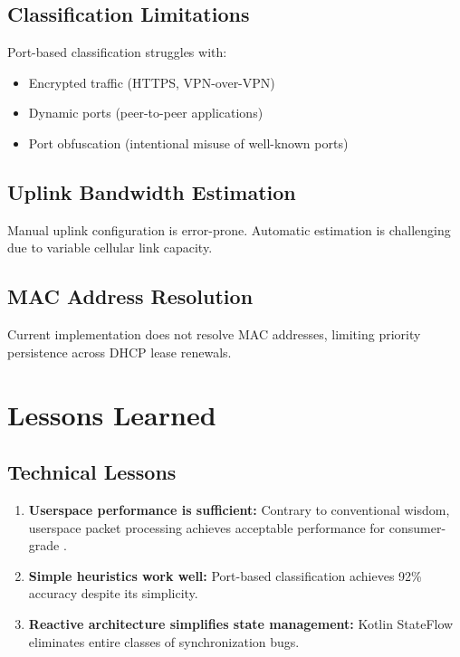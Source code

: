 \subsection{Classification Limitations}

Port-based classification struggles with:
\begin{itemize}
    \item Encrypted traffic (HTTPS, VPN-over-VPN)
    \item Dynamic ports (peer-to-peer applications)
    \item Port obfuscation (intentional misuse of well-known ports)
\end{itemize}

\subsection{Uplink Bandwidth Estimation}

Manual uplink configuration is error-prone. Automatic estimation is challenging due to variable cellular link capacity.

\subsection{MAC Address Resolution}

Current implementation does not resolve MAC addresses, limiting priority persistence across DHCP lease renewals.

\section{Lessons Learned}

\subsection{Technical Lessons}

\begin{enumerate}
    \item \textbf{Userspace performance is sufficient:} Contrary to conventional wisdom, userspace packet processing achieves acceptable performance for consumer-grade \qos.
    
    \item \textbf{Simple heuristics work well:} Port-based classification achieves 92\% accuracy despite its simplicity.
    
    \item \textbf{Reactive architecture simplifies state management:} Kotlin StateFlow eliminates entire classes of synchronization bugs.
\end{enumerate}

